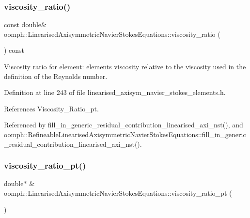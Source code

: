\subsubsection{\texorpdfstring{viscosity\+\_\+ratio()}{viscosity\_ratio()}}
{\footnotesize\ttfamily const double\& oomph\+::\+Linearised\+Axisymmetric\+Navier\+Stokes\+Equations\+::viscosity\+\_\+ratio (\begin{DoxyParamCaption}{ }\end{DoxyParamCaption}) const\hspace{0.3cm}{\ttfamily [inline]}}



Viscosity ratio for element\+: element\textquotesingle{}s viscosity relative to the viscosity used in the definition of the Reynolds number. 



Definition at line 243 of file linearised\+\_\+axisym\+\_\+navier\+\_\+stokes\+\_\+elements.\+h.



References Viscosity\+\_\+\+Ratio\+\_\+pt.



Referenced by fill\+\_\+in\+\_\+generic\+\_\+residual\+\_\+contribution\+\_\+linearised\+\_\+axi\+\_\+nst(), and oomph\+::\+Refineable\+Linearised\+Axisymmetric\+Navier\+Stokes\+Equations\+::fill\+\_\+in\+\_\+generic\+\_\+residual\+\_\+contribution\+\_\+linearised\+\_\+axi\+\_\+nst().

\mbox{\label{classoomph_1_1LinearisedAxisymmetricNavierStokesEquations_a8c4e697a9b821bc42caba8edb3a48417}} 
\subsubsection{\texorpdfstring{viscosity\+\_\+ratio\+\_\+pt()}{viscosity\_ratio\_pt()}}
{\footnotesize\ttfamily double$\ast$ \& oomph\+::\+Linearised\+Axisymmetric\+Navier\+Stokes\+Equations\+::viscosity\+\_\+ratio\+\_\+pt (\begin{DoxyParamCaption}{ }\end{DoxyParamCaption})\hspace{0.3cm}{\ttfamily [inline]}}



